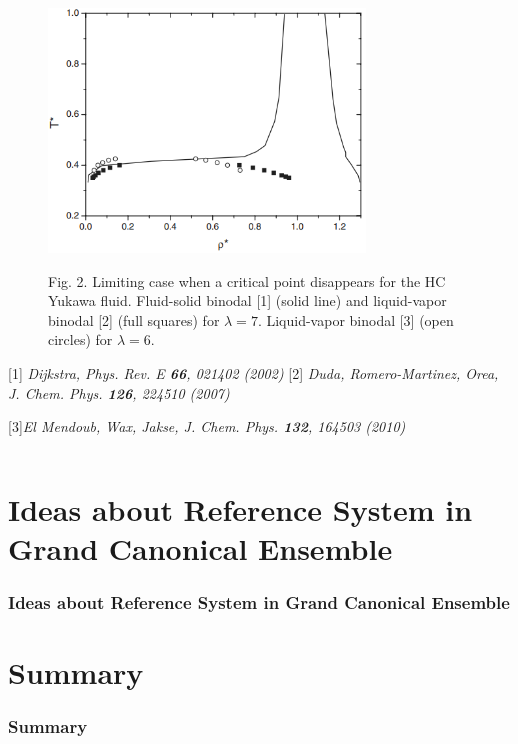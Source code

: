 \documentclass[8pt]{beamer}
\begin{document}
\begin{frame}
\begin{columns}
			\begin{column}{0.5\textwidth}
				\begin{figure}[htbp]
					\includegraphics[width=0.75\textwidth,angle=0]{limit_cp} \\
					\parbox{1.0\textwidth}{\caption*{Fig. 2. Limiting case when a critical point disappears for the HC Yukawa fluid. Fluid-solid binodal [1] (solid line) and liquid-vapor binodal [2] (full squares) for $\lambda=7$. Liquid-vapor binodal [3] (open circles) for $\lambda = 6$.
					}}
				\end{figure}
				
				[1] \textit{Dijkstra, Phys. Rev. E \textbf{66}, 021402 (2002)}
				[2] \textit{Duda, Romero-Martinez, Orea, J. Chem. Phys. \textbf{126}, 224510 (2007)}
				
				[3]\textit{El Mendoub, Wax, Jakse, J. Chem. Phys. \textbf{132}, 164503 (2010)}
			\end{column}
			
		\end{columns}
		
	\end{frame}
	
	\section{Ideas about Reference System in Grand Canonical Ensemble}
	
	\begin{frame}
		\frametitle{Ideas about Reference System in Grand Canonical Ensemble}
	\end{frame}
	
	\section{Summary}
	
	\begin{frame}
		\frametitle{Summary}
	\end{frame}
	
	
	
\end{document}
